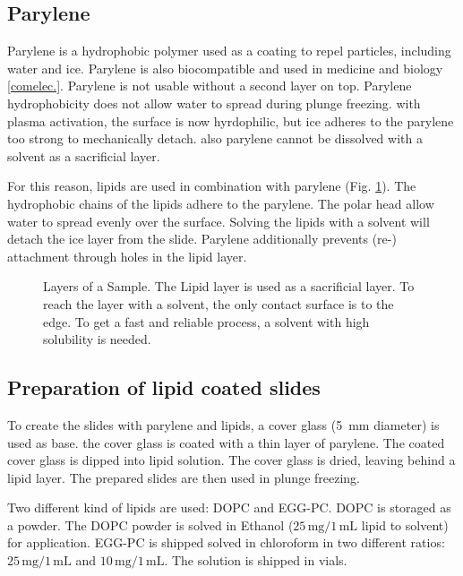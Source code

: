 \subsection{Parylene}

Parylene is a hydrophobic polymer used as a coating to repel particles, including water and ice. Parylene is also biocompatible and used in medicine and biology \ref{comelec.}. Parylene is not usable without a second layer on top. Parylene hydrophobicity does not allow water to spread during plunge freezing. with plasma activation, the surface is now hyrdophilic, but ice adheres to the parylene too strong to mechanically detach. also parylene cannot be dissolved with a solvent as a sacrificial layer.

For this reason, lipids are used in combination with parylene (Fig. \ref{fig:sacrificial layer}). The hydrophobic chains of the lipids adhere to the parylene. The polar head allow water to spread evenly over the surface. Solving the lipids with a solvent will detach the ice layer from the slide. Parylene additionally prevents (re-) attachment through holes in the lipid layer. 

\begin{figure}[hbt!]
	\centering
	
	\caption{Layers of a Sample. The Lipid layer is used as a sacrificial layer. To reach the layer with a solvent, the only contact surface is to the edge. To get a fast and reliable process, a solvent with high solubility is needed.}
	\label{fig:sacrificial layer}
\end{figure}


\subsection{Preparation of lipid coated slides}

To create the slides with parylene and lipids, a cover glass (\SI{5}{\milli\meter} diameter) is used as base. the cover glass is coated with a thin layer of parylene. The coated cover glass is dipped into lipid solution. The cover glass is dried, leaving behind a lipid layer. The prepared slides are then used in plunge freezing.

Two different kind of lipids are used: DOPC and EGG-PC. DOPC is storaged as a powder. The DOPC powder is solved in Ethanol ($25\,\si{\milli\gram}/1\,\si{\milli\liter}$ lipid to solvent) for application. 
EGG-PC is shipped solved in chloroform in two different ratios: $25\,\si{\milli\gram}/1\,\si{\milli\liter}$ and $10\,\si{\milli\gram}/1\,\si{\milli\liter}$. The solution is shipped in vials.

